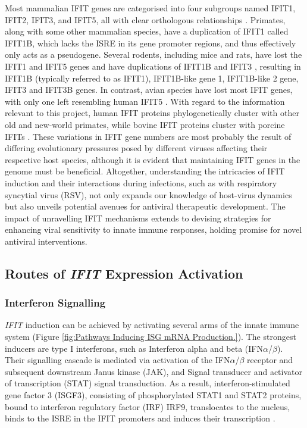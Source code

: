 Most mammalian IFIT genes are categorised into four subgroups named IFIT1, IFIT2, IFIT3, and IFIT5, all with clear orthologous relationships \cite{Sarkar2004NovelGenes}. Primates, along with some other mammalian species, have a duplication of IFIT1 called IFIT1B, which lacks the ISRE in its gene promoter regions, and thus effectively only acts as a pseudogene. Several rodents, including mice and rats, have lost the IFIT1 and IFIT5 genes and have duplications of IFIT1B and IFIT3 \cite{Daugherty2016Evolution-guidedMammals.}, resulting in IFIT1B (typically referred to as IFIT1), IFIT1B-like gene 1, IFIT1B-like 2 gene, IFIT3 and IFIT3B genes. In contrast, avian species have lost most IFIT genes, with only one left resembling human IFIT5 \cite{Liu2013Lineage-SpecificFamily}. With regard to the information relevant to this project, human IFIT proteins phylogenetically cluster with other old and new-world primates, while bovine IFIT proteins cluster with porcine IFITs \cite{Zhou2013InterferonDefense.}. These variations in IFIT gene numbers are most probably the result of differing evolutionary pressures posed by different viruses affecting their respective host species, although it is evident that maintaining IFIT genes in the genome must be beneficial. Altogether, understanding the intricacies of IFIT induction and their interactions during infections, such as with respiratory syncytial virus (RSV), not only expands our knowledge of host-virus dynamics but also unveils potential avenues for antiviral therapeutic development. The impact of unravelling IFIT mechanisms extends to devising strategies for enhancing viral sensitivity to innate immune responses, holding promise for novel antiviral interventions.

\subsection{Routes of \textit{IFIT} Expression Activation} \label{subsec:Routes of IFIT Expression Activation}
\subsubsection{Interferon Signalling} \label{Interferon Signalling}
\textit{IFIT} induction can be achieved by activating several arms of the innate immune system (Figure \ref{fig:Pathways Inducing ISG mRNA Production.}). The strongest inducers are type I interferons, such as Interferon alpha and beta (IFN\(\alpha\)/\(\beta\)). Their signalling cascade is mediated via activation of the IFN\(\alpha\)/\(\beta\) receptor and subsequent downstream Janus kinase (JAK), and Signal transducer and activator of transcription (STAT) signal transduction. As a result, interferon-stimulated gene factor 3 (ISGF3), consisting of phosphorylated STAT1 and STAT2 proteins, bound to interferon regulatory factor (IRF) IRF9, translocates to the nucleus, binds to the ISRE in the IFIT promoters and induces their transcription \cite{Der1998IdentificationArrays, Mesev2019DecodingInfection, Schoggins2011Interferon-stimulatedFunctions}.

